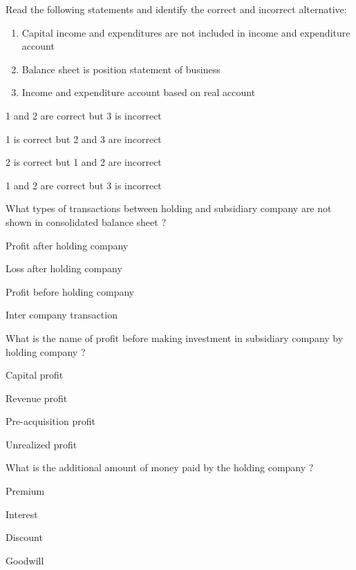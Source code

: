 \begin{questions}
\question Read the following statements and identify the correct and incorrect alternative:
  \begin{enumerate}
  \item Capital income and expenditures are not included in income and expenditure account
  \item Balance sheet is position statement of business
  \item Income and expenditure account based on real account
  \end{enumerate}
  \begin{items}
  \item 1 and 2 are correct but 3 is incorrect
  \item 1 is correct but 2 and 3 are incorrect
  \item 2 is correct but 1 and 2 are incorrect
  \item 1 and 2 are correct but 3 is incorrect
  \end{items}

\question What types of transactions between holding and subsidiary company are not shown in consolidated balance sheet ?
  \begin{items}
  \item Profit after holding company
  \item Loss after holding company
  \item Profit before holding company
  \item Inter company transaction
  \end{items}

\question What is the name of profit before making investment in subsidiary company by holding company ?
  \begin{items}
  \item Capital profit
  \item Revenue profit
  \item Pre-acquisition profit
  \item Unrealized profit
  \end{items}

\question What is the additional amount of money paid by the holding company ?
  \begin{items}
  \item Premium
  \item Interest
  \item Discount
  \item Goodwill
  \end{items}

\end{questions}
